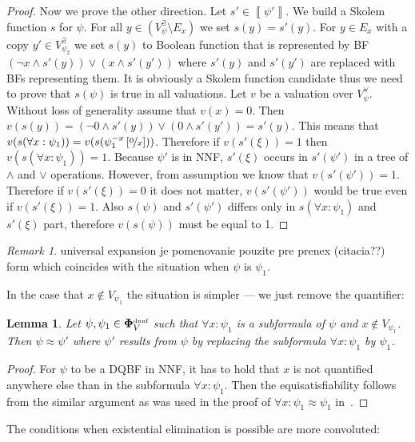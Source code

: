 \documentclass[
  digital, %
  twoside, %
  table,   %
  nolof,     %
  nolot,     %
]{fithesis3}
\newtheorem{lemma}[theorem]{Lemma}         %
\theoremstyle{definition}
\theoremstyle{remark}
\newtheorem*{remark}{Remark}
\newcommand{\seman}[1]{\left\llbracket {#1} \right\rrbracket}
\newcommand{\substitute}[2]{\left[ \nicefrac{#2}{#1} \right]}
\newcommand{\DQBF}[1]{\mathbf{\Phi}_{#1}^{\text{\tiny dnnf}}}
\newcommand{\evars}[1]{V_{#1}^{\exists}}
\newcommand{\uvars}[1]{V_{#1}^{\forall}}
\begin{document}
\begin{proof}
  Now we prove the other direction. Let $s' \in \seman{\psi'}$. We build a Skolem function $s$ for $\psi$. For all $y \in (\evars{\psi} \setminus E_x)$ we set $s(y) = s'(y)$. For $y \in E_x$ with a copy $y' \in \evars{\psi_2}$ we set $s(y)$ to Boolean function that is represented by BF $(\neg x \land s'(y)) \lor (x \land s'(y'))$ where $s'(y)$ and $s'(y')$ are replaced with BFs representing them. It is obviously a Skolem function candidate thus we need to prove that $s(\psi)$ is true in all valuations. Let $v$ be a valuation over $\uvars{\psi}$. Without loss of generality assume that $v(x) = 0$. Then $v(s(y)) = (\neg 0 \land s'(y)) \lor (0 \land s'(y')) = s'(y)$. This means that $v(s(\forall x : \psi_1)) = v(s(\psi_1^{-x}\substitute{x}{0}))$. Therefore if $v(s'(\xi)) = 1$ then $v(s(\forall x : \psi_1)) = 1$. Because $\psi'$ is in NNF, $s'(\xi)$ occurs in $s'(\psi')$ in a tree of ${\land}$ and ${\lor}$ operations. However, from assumption we know that $v(s'(\psi')) = 1$. Therefore if $v(s'(\xi)) = 0$ it does not matter, $v(s'(\psi'))$ would be true even if $v(s'(\xi)) = 1$. Also $s(\psi)$ and $s'(\psi')$ differs only in $s(\forall x : \psi_1)$ and $s'(\xi)$ part, therefore $v(s(\psi))$ must be equal to 1. 
\end{proof}

\begin{remark}
universal expansion je pomenovanie pouzite pre prenex (citacia??) form which coincides with the situation when $\psi$ is $\psi_1$.
\end{remark}

In the case that $x \not\in V_{\psi_1}$ the situation is simpler --- we just remove the quantifier:
\begin{lemma}
Let $\psi, \psi_1 \in \DQBF{V}$ such that $\forall x : \psi_1$ is a subformula of $\psi$ and $x \not\in V_{\psi_1}$. Then $\psi \approx \psi'$ where $\psi'$ results from $\psi$ by replacing the subformula $\forall x : \psi_1$ by $\psi_1$.
\end{lemma}
\begin{proof}
  For $\psi$ to be a DQBF in NNF, it has to hold that $x$ is not quantified anywhere else than in the subformula $\forall x : \psi_1$. Then the equisatisfiability follows from the similar argument as was used in the proof of $\forall x : \psi_1 \approx \psi_1$ in~\cite[Theorem 3]{HQSquantifierLocalization}.
\end{proof}

The conditions when existential elimination is possible are more convoluted:
\end{document}
